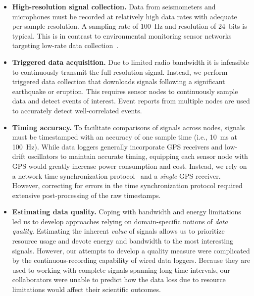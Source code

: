 \begin{itemize}

\item \textbf{High-resolution signal collection.} Data from seismometers and
microphones must be recorded at relatively high data rates with adequate
per-sample resolution. A sampling rate of 100~Hz and resolution of 24~bits is
typical. This is in contrast to environmental monitoring sensor networks
targeting low-rate data collection~\cite{gdi-sensys04,berkeley-redwoods}.

\item \textbf{Triggered data acquisition.} Due to limited radio bandwidth it
is infeasible to continuously transmit the full-resolution signal. Instead,
we perform triggered data collection that downloads signals following a
significant earthquake or eruption. This requires sensor nodes to
continuously sample data and detect events of interest. Event reports from
multiple nodes are used to accurately detect well-correlated events.

\item \textbf{Timing accuracy.} To facilitate comparisons of signals across
nodes, signals must be timestamped with an accuracy of one sample time (i.e.,
10~ms at 100~Hz). While data loggers generally incorporate GPS receivers and
low-drift oscillators to maintain accurate timing, equipping each sensor node
with GPS would greatly increase power consumption and cost. Instead, we rely
on a network time synchronization protocol~\cite{rbs,ftsp} and a
\textit{single} GPS receiver. However, correcting for errors in the time
synchronization protocol required extensive post-processing of the raw
timestamps.

\item \textbf{Estimating data quality.} Coping with bandwidth and energy
limitations led us to develop approaches relying on domain-specific notions
of \textit{data quality}. Estimating the inherent \textit{value} of signals
allows us to prioritize resource usage and devote energy and bandwidth to the
most interesting signals. However, our attempts to develop a quality measure
were complicated by the continuous-recording capability of wired data
loggers. Because they are used to working with complete signals spanning long
time intervals, our collaborators were unable to predict how the data loss
due to resource limitations would affect their scientific outcomes.


\end{itemize}
